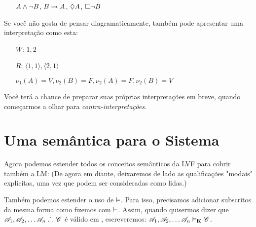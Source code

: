 \begin{itemize}
	\item[]$A\wedge\neg B$, $B\rightarrow A$, $\Diamond A$, $\Box\neg B$
\end{itemize}
Se você não gosta de pensar diagramaticamente, também pode apresentar uma interpretação como esta:
\begin{itemize}
	\item[$W$:]$1,2$
	\item[$R$:]$\langle 1,1\rangle, \langle 2,1\rangle$
	\item[]$\nu_{1}(A)=V, \nu_{2}(B)=F, \nu_{2}(A)=F, \nu_{2}(B)=V$
\end{itemize}
Você terá a chance de preparar suas próprias interpretações 
em breve, quando começarmos a olhar para \emph{contra-interpretações}.

\section{Uma semântica para o Sistema \mlK}
\label{SemanticsK}

Agora podemos estender todos os conceitos semânticos da  LVF para cobrir também a LM:
(De agora em diante, deixaremos de lado as qualificações "modais" explícitas, uma vez que podem ser consideradas como lidas.)


Também podemos estender o uso de $\vDash$. Para isso, precisamos adicionar subscritos da mesma forma como fizemos com $\vdash$. Assim, quando quisermos dizer que $\mathscr{A}_1,\mathscr{A}_2, \dots \mathscr{A}_n\mathrel{\ldotp\dot{}\,\ldotp}\mathscr{C}$  é válido em \mlK, escreveremos: $\mathscr{A}_1,\mathscr{A}_2, \dots \mathscr{A}_n\vDash_{\mathbf{K}}\mathscr{C}$. 

